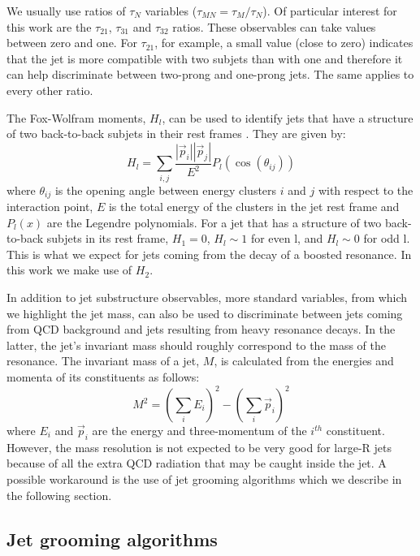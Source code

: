 We usually use ratios of $\tau_N$ variables ($\tau_{MN}=\tau_M/\tau_N$). Of particular interest for this work are the $\tau_{21}$, $\tau_{31}$ and $\tau_{32}$ ratios. These observables can take values between zero and one. For $\tau_{21}$, for example, a small value (close to zero) indicates that the jet is more compatible with two subjets than with one and therefore it can help discriminate between two-prong and one-prong jets. The same applies to every other ratio. 

The Fox-Wolfram moments, $H_l$, can be used to identify jets that have a structure of two back-to-back subjets in their rest frames \cite{FW2}. They are given by:
\begin{equation}
H_l = \sum_{i,j}\frac{|\vec{p}_i||\vec{p}_j|}{E^2}P_l(\cos(\theta_{ij}))
\end{equation}  
where $\theta_{ij}$ is the opening angle between energy clusters $i$ and $j$ with respect to the interaction point, $E$ is the total energy of the clusters in the jet rest frame and $P_l(x)$ are the Legendre polynomials. For a jet that has a structure of two back-to-back subjets in its rest frame, $H_1 = 0$, $H_l \sim 1$ for even l, and $H_l \sim 0$ for odd l. This is what we expect for jets coming from the decay of a boosted resonance. In this work we make use of $H_2$.

In addition to jet substructure observables, more standard variables, from which we highlight the jet mass, can also be used to discriminate between jets coming from QCD background and jets resulting from heavy resonance decays. In the latter, the jet's invariant mass should roughly correspond to the mass of the resonance. The invariant mass of a jet, $M$, is  calculated from the energies and momenta of its constituents as follows:
\begin{equation}
	M^2=\left(\sum_{i}E_i\right)^2-\left(\sum_{i}\vec{p}_i\right)^2
\end{equation}
where $E_i$ and $\vec{p}_i$ are the energy and three-momentum of the $i^{th}$ constituent. However, the mass resolution is not expected to be very good for large-R jets because of all the extra QCD radiation that may be caught inside the jet. A possible workaround is the use of jet grooming algorithms which we describe in the following section.

\subsection{Jet grooming algorithms}
\label{section:jet_groom}

